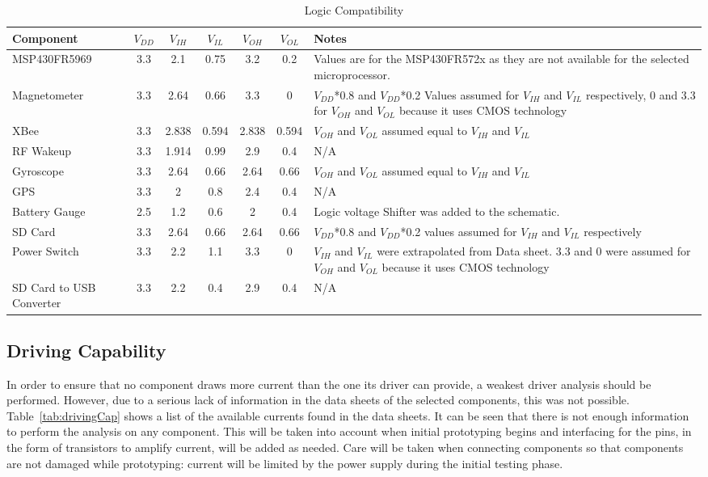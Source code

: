 \begin{table}[H]
  \centering
  \caption{Logic Compatibility}
    \begin{tabular}{|p{1.2in}|c|c|c|c|c|p{1.8in}|}
    \hline
    Component & $V_{DD}$   & $V_{IH}$   & $V_{IL}$   & $V_{OH}$   & $V_{OL}$   & Notes \\
    \hline \hline
    MSP430FR5969 & 3.3   & 2.1   & 0.75  & 3.2   & 0.2   & Values are for the MSP430FR572x as they are not available for the selected microprocessor. \\ \hline
    Magnetometer & 3.3   & 2.64  & 0.66  & 3.3   & 0     & $V_{DD}$*0.8 and $V_{DD}$*0.2 Values assumed for $V_{IH}$ and $V_{IL}$ respectively, 0 and 3.3 for $V_{OH}$ and $V_{OL}$ because it uses CMOS technology \\ \hline
    XBee  & 3.3   & 2.838 & 0.594 & 2.838 & 0.594 & $V_{OH}$ and $V_{OL}$ assumed equal to $V_{IH}$ and $V_{IL}$ \\ \hline
    RF Wakeup & 3.3   & 1.914 & 0.99  & 2.9   & 0.4   & N/A \\ \hline
    Gyroscope & 3.3   & 2.64  & 0.66  & 2.64  & 0.66  & $V_{OH}$ and $V_{OL}$ assumed equal to $V_{IH}$ and $V_{IL}$ \\ \hline
    GPS   & 3.3   & 2     & 0.8   & 2.4   & 0.4   & N/A \\ \hline
    Battery Gauge & 2.5   & 1.2   & 0.6   & 2     & 0.4   & Logic voltage Shifter was added to the schematic. \\ \hline
    SD Card & 3.3   & 2.64  & 0.66  & 2.64  & 0.66  & $V_{DD}$*0.8 and $V_{DD}$*0.2 values assumed for $V_{IH}$ and $V_{IL}$ respectively \\\hline
    Power Switch & 3.3   & 2.2   & 1.1   & 3.3   & 0     & $V_{IH}$ and $V_{IL}$ were extrapolated from Data sheet. 3.3 and 0 were assumed for $V_{OH}$ and $V_{OL}$ because it uses CMOS technology \\ \hline
    SD Card to USB Converter & 3.3   & 2.2   & 0.4   & 2.9   & 0.4   & N/A \\ \hline
    \end{tabular}%
  \label{tab:logicComp}%
\end{table}%


\subsection{Driving Capability}

In order to ensure that no component draws more current than the one its driver can provide, a weakest driver analysis should be performed.  However, due to a serious lack of information in the data sheets of the selected components, this was not possible.  Table~\ref{tab:drivingCap} shows a list of the available currents found in the data sheets.  It can be seen that there is not enough information to perform the analysis on any component.  This will be taken into account when initial prototyping begins and interfacing for the pins, in the form of transistors to amplify current, will be added as needed.  Care will be taken when connecting components so that components are not damaged while prototyping: current will be limited by the power supply during the initial testing phase.

